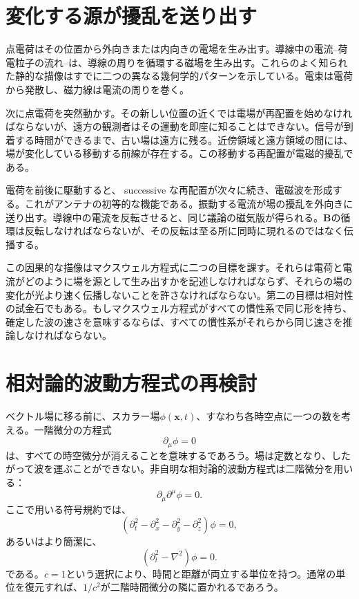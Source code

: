 \section{変化する源が擾乱を送り出す}

点電荷はその位置から外向きまたは内向きの電場を生み出す。導線中の電流--荷電粒子の流れ--は、導線の周りを循環する磁場を生み出す。これらのよく知られた静的な描像はすでに二つの異なる幾何学的パターンを示している。電束は電荷から発散し、磁力線は電流の周りを巻く。

次に点電荷を突然動かす。その新しい位置の近くでは電場が再配置を始めなければならないが、遠方の観測者はその運動を即座に知ることはできない。信号が到着する時間ができるまで、古い場は遠方に残る。近傍領域と遠方領域の間には、場が変化している移動する前線が存在する。この移動する再配置が電磁的擾乱である。

電荷を前後に駆動すると、 successive な再配置が次々に続き、電磁波を形成する。これがアンテナの初等的な機能である。振動する電流が場の擾乱を外向きに送り出す。導線中の電流を反転させると、同じ議論の磁気版が得られる。\(\mathbf B\)の循環は反転しなければならないが、その反転は至る所に同時に現れるのではなく伝播する。

この因果的な描像はマクスウェル方程式に二つの目標を課す。それらは電荷と電流がどのように場を源として生み出すかを記述しなければならず、それらの場の変化が光より速く伝播しないことを許さなければならない。第二の目標は相対性の試金石でもある。もしマクスウェル方程式がすべての慣性系で同じ形を持ち、確定した波の速さを意味するならば、すべての慣性系がそれらから同じ速さを推論しなければならない。

\section{相対論的波動方程式の再検討}

ベクトル場に移る前に、スカラー場\(\phi(\mathbf x,t)\)、すなわち各時空点に一つの数を考える。一階微分の方程式
\begin{equation}
\partial_\mu\phi=0
\end{equation}
は、すべての時空微分が消えることを意味するであろう。場は定数となり、したがって波を運ぶことができない。非自明な相対論的波動方程式は二階微分を用いる：
\begin{equation}
\partial_\mu\partial^\mu\phi=0.
\end{equation}
ここで用いる符号規約では、
\begin{equation}
\left(\partial_t^2-\partial_x^2-\partial_y^2-\partial_z^2\right)\phi=0,
\label{eq:scalar-wave-four}
\end{equation}
あるいはより簡潔に、
\begin{equation}
\left(\partial_t^2-\nabla^2\right)\phi=0.
\end{equation}
である。\(c=1\)という選択により、時間と距離が両立する単位を持つ。通常の単位を復元すれば、\(1/c^2\)が二階時間微分の隣に置かれるであろう。

